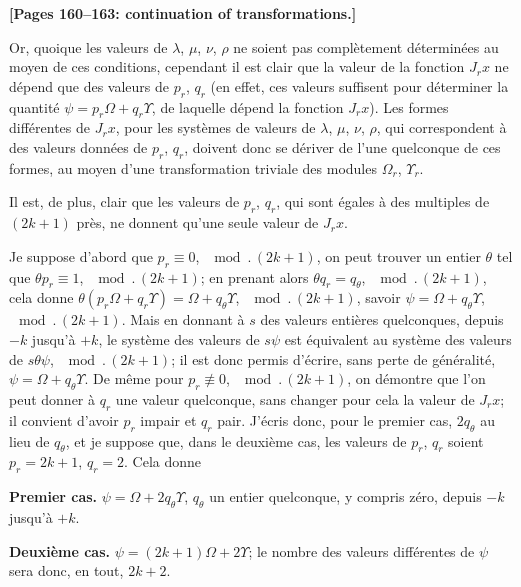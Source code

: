 \documentclass[11pt,a4paper]{book}
\begin{document}
\medskip
\noindent\textbf{[Pages 160--163: continuation of transformations.]}

Or, quoique les valeurs de $\lambda$, $\mu$, $\nu$, $\rho$ ne soient pas
compl\`etement d\'etermin\'ees au moyen de ces conditions, cependant il est
clair que la valeur de la fonction $J_r x$ ne d\'epend que des valeurs de
$p_r$, $q_r$ (en effet, ces valeurs suffisent pour d\'eterminer la quantit\'e
$\psi = p_r\Omega + q_r\Upsilon$, de laquelle d\'epend la fonction $J_r x$).
Les formes diff\'erentes de $J_r x$, pour les syst\`emes de valeurs de
$\lambda$, $\mu$, $\nu$, $\rho$, qui correspondent \`a des valeurs donn\'ees de
$p_r$, $q_r$, doivent donc se d\'eriver de l'une quelconque de ces formes,
au moyen d'une transformation triviale des modules $\Omega_r$, $\Upsilon_r$.

Il est, de plus, clair que les valeurs de $p_r$, $q_r$, qui sont \'egales
\`a des multiples de $(2k+1)$ pr\`es, ne donnent qu'une seule valeur de
$J_r x$.

Je suppose d'abord que $p_r \equiv 0$, $\mod.\,(2k+1)$, on peut trouver un
entier $\theta$ tel que $\theta p_r \equiv 1$, $\mod.\,(2k+1)$; en prenant alors
$\theta q_r = q_\theta$, $\mod.\,(2k+1)$, cela donne
$\theta(p_r\Omega + q_r\Upsilon) = \Omega + q_\theta\Upsilon$,
$\mod.\,(2k+1)$, savoir $\psi = \Omega + q_\theta\Upsilon$,
$\mod.\,(2k+1)$. Mais en donnant \`a $s$ des valeurs enti\`eres quelconques,
depuis $-k$ jusqu'\`a $+k$, le syst\`eme des valeurs de $s\psi$ est
\'equivalent au syst\`eme des valeurs de $s\theta\psi$, $\mod.\,(2k+1)$; il
est donc permis d'\'ecrire, sans perte de g\'en\'eralit\'e,
$\psi = \Omega + q_\theta\Upsilon$. De m\^eme pour $p_r \not\equiv 0$,
$\mod.\,(2k+1)$, on d\'emontre que l'on peut donner \`a $q_r$ une valeur
quelconque, sans changer pour cela la valeur de $J_r x$; il convient d'avoir
$p_r$ impair et $q_r$ pair. J'\'ecris donc, pour le premier cas, $2q_\theta$
au lieu de $q_\theta$, et je suppose que, dans le deuxi\`eme cas, les valeurs
de $p_r$, $q_r$ soient $p_r = 2k+1$, $q_r = 2$. Cela donne

\smallskip
\textbf{Premier cas.} $\psi = \Omega + 2q_\theta\Upsilon$, $q_\theta$ un entier
quelconque, y compris z\'ero, depuis $-k$ jusqu'\`a $+k$.

\smallskip
\textbf{Deuxi\`eme cas.} $\psi = (2k+1)\Omega + 2\Upsilon$;
le nombre des valeurs diff\'erentes de $\psi$ sera donc, en tout, $2k+2$.

\medskip
\end{document}
